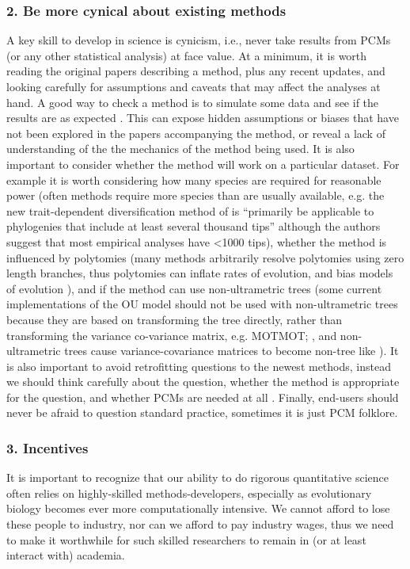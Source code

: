 \documentclass[a4paper,12pt]{article}
\begin{document}
  \subsubsection{2. Be more cynical about existing methods}
    A key skill to develop in science is cynicism, i.e., never take results from PCMs (or any other statistical analysis) at face value.
    At a minimum, it is worth reading the original papers describing a method, plus any recent updates, and looking carefully for assumptions and caveats that may affect the analyses at hand.
    A good way to check a method is to simulate some data and see if the results are as expected \citep[e.g.][]{boettiger2012your}. 
    This can expose hidden assumptions or biases that have not been explored in the papers accompanying the method, or reveal a lack of understanding of the the mechanics of the method being used. 
    It is also important to consider whether the method will work on a particular dataset.
    For example it is worth considering how many species are required for reasonable power (often methods require more species than are usually available, e.g. the new trait-dependent diversification method of \citet{rabosky2015robust} is ``primarily be applicable to phylogenies that include at least several thousand tips'' although the authors suggest that most empirical analyses have \textless 1000 tips), whether the method is influenced by polytomies (many methods arbitrarily resolve polytomies using zero length branches, thus polytomies can inflate rates of evolution, and bias models of evolution \citealp{cooper2010body}), and if the method can use non-ultrametric trees (some current implementations of the OU model should not be used with non-ultrametric trees because they are based on transforming the tree directly, rather than transforming the variance co-variance matrix, e.g. MOTMOT; \citealp{Thomas:2011aa}, and non-ultrametric trees cause variance-covariance matrices to become non-tree like \citealp{slater2014correction}). 
    It is also important to avoid retrofitting questions to the newest methods, instead we should think carefully about the question, whether the method is appropriate for the question, and whether PCMs are needed at all \citep{westoby1995misinterpreting,losos2011seeing}.
    Finally, end-users should never be afraid to question standard practice, sometimes it is just PCM folklore.

  \subsubsection{3. Incentives}
    It is important to recognize that our ability to do rigorous quantitative science often relies on highly-skilled methods-developers, especially as evolutionary biology becomes ever more computationally intensive. 
    We cannot afford to lose these people to industry, nor can we afford to pay industry wages, thus we need to make it worthwhile for such skilled researchers to remain in (or at least interact with) academia.
\end{document}
